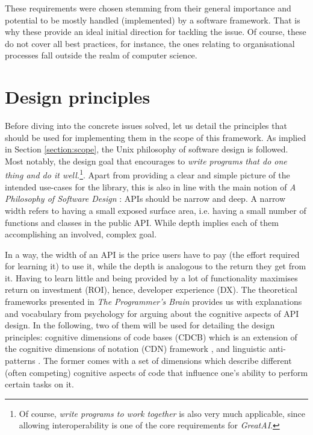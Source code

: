 These requirements were chosen stemming from their general importance and potential to be mostly handled (implemented) by a software framework. That is why these provide an ideal initial direction for tackling the issue. Of course, these do not cover all best practices, for instance, the ones relating to organisational processes fall outside the realm of computer science.

\section{Design principles}

Before diving into the concrete issues solved, let us detail the principles that should be used for implementing them in the scope of this framework. As implied in Section \ref{section:scope}, the Unix philosophy \cite{ritchie1978unix,salus1994quarter} of software design is followed. Most notably, the design goal that encourages to \textit{write programs that do one thing and do it well.}\footnote{Of course, \textit{write programs to work together} is also very much applicable, since allowing interoperability is one of the core requirements for \textit{GreatAI}.}. Apart from providing a clear and simple picture of the intended use-cases for the library, this is also in line with the main notion of \textit{A Philosophy of Software Design} \cite{ousterhout2018philosophy}: APIs should be narrow and deep. A narrow width refers to having a small exposed surface area, i.e. having a small number of functions and classes in the public API. While depth implies each of them accomplishing an involved, complex goal. 

In a way, the width of an API is the price users have to pay (the effort required for learning it) to use it, while the depth is analogous to the return they get from it. Having to learn little and being provided by a lot of functionality maximises return on investment (ROI), hence, developer experience (DX). The theoretical frameworks presented in \textit{The Programmer's Brain} \cite{hermans2021programmer} provides us with explanations and vocabulary from psychology for arguing about the cognitive aspects of API design. In the following, two of them will be used for detailing the design principles: cognitive dimensions of code bases (CDCB) which is an extension of the cognitive dimensions of notation (CDN) framework \cite{blackwell2001cognitive}, and linguistic anti-patterns \cite{arnaoudova2016linguistic}. The former comes with a set of dimensions which describe different (often competing) cognitive aspects of code that influence one's ability to perform certain tasks on it.

